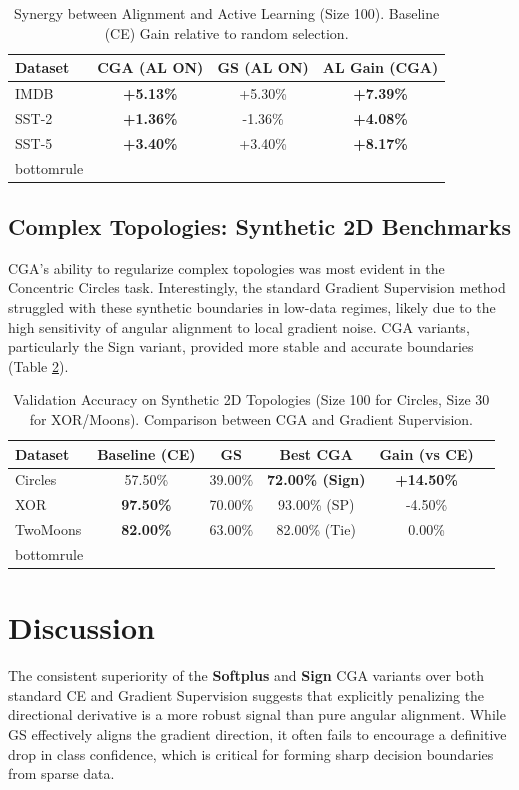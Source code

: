 \documentclass[sigconf,anonymous]{aamas}
\begin{document}
\begin{table}[h]
\centering
\caption{Synergy between Alignment and Active Learning (Size 100). Baseline (CE) Gain relative to random selection.}
\label{tab:al_synergy}
\begin{tabular}{lccc}
\toprule
\textbf{Dataset} & \textbf{CGA (AL ON)} & \textbf{GS (AL ON)} & \textbf{AL Gain (CGA)} \\ \midrule
IMDB & \textbf{+5.13\%} & +5.30\% & \textbf{+7.39\%}
 \\SST-2 & \textbf{+1.36\%} & -1.36\% & \textbf{+4.08\%}
 \\SST-5 & \textbf{+3.40\%} & +3.40\% & \textbf{+8.17\%} \\bottomrule
\end{tabular}
\end{table}

\subsection{Complex Topologies: Synthetic 2D Benchmarks}
CGA's ability to regularize complex topologies was most evident in the Concentric Circles task. Interestingly, the standard Gradient Supervision method struggled with these synthetic boundaries in low-data regimes, likely due to the high sensitivity of angular alignment to local gradient noise. CGA variants, particularly the Sign variant, provided more stable and accurate boundaries (Table \ref{tab:2d_results}).

\begin{table}[h]
\centering
\caption{Validation Accuracy on Synthetic 2D Topologies (Size 100 for Circles, Size 30 for XOR/Moons). Comparison between CGA and Gradient Supervision.}
\label{tab:2d_results}
\begin{tabular}{@{}lccccc@{}}
\toprule
\textbf{Dataset} & \textbf{Baseline (CE)} & \textbf{GS \cite{teney2020learning}} & \textbf{Best CGA} & \textbf{Gain (vs CE)} \\ \midrule
Circles & 57.50\% & 39.00\% & \textbf{72.00\% (Sign)} & \textbf{+14.50\%}
 \\XOR     & \textbf{97.50\%} & 70.00\% & 93.00\% (SP) & -4.50\%
 \\TwoMoons & \textbf{82.00\%} & 63.00\% & 82.00\% (Tie) & 0.00\% \\bottomrule
\end{tabular}
\end{table}

\section{Discussion}
\label{sec:discussion}
The consistent superiority of the \textbf{Softplus} and \textbf{Sign} CGA variants over both standard CE and Gradient Supervision suggests that explicitly penalizing the directional derivative is a more robust signal than pure angular alignment. While GS effectively aligns the gradient direction, it often fails to encourage a definitive drop in class confidence, which is critical for forming sharp decision boundaries from sparse data. 
\end{document}

